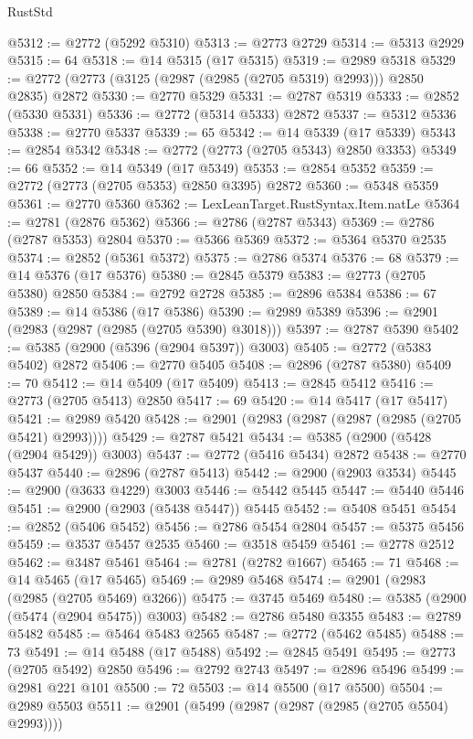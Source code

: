 \begin{lexlean}{RustStd}
\begin{coremodule}
@5312 := @2772 (@5292 @5310)
@5313 := @2773 @2729
@5314 := @5313 @2929
@5315 := 64
@5318 := @14 @5315 (@17 @5315)
@5319 := @2989 @5318
@5329 := @2772 (@2773 (@3125 (@2987 (@2985 (@2705 @5319) @2993))) @2850 @2835) @2872
@5330 := @2770 @5329
@5331 := @2787 @5319
@5333 := @2852 (@5330 @5331)
@5336 := @2772 (@5314 @5333) @2872
@5337 := @5312 @5336
@5338 := @2770 @5337
@5339 := 65
@5342 := @14 @5339 (@17 @5339)
@5343 := @2854 @5342
@5348 := @2772 (@2773 (@2705 @5343) @2850 @3353)
@5349 := 66
@5352 := @14 @5349 (@17 @5349)
@5353 := @2854 @5352
@5359 := @2772 (@2773 (@2705 @5353) @2850 @3395) @2872
@5360 := @5348 @5359
@5361 := @2770 @5360
@5362 := LexLeanTarget.RustSyntax.Item.natLe
@5364 := @2781 (@2876 @5362)
@5366 := @2786 (@2787 @5343)
@5369 := @2786 (@2787 @5353) @2804
@5370 := @5366 @5369
@5372 := @5364 @5370 @2535
@5374 := @2852 (@5361 @5372)
@5375 := @2786 @5374
@5376 := 68
@5379 := @14 @5376 (@17 @5376)
@5380 := @2845 @5379
@5383 := @2773 (@2705 @5380) @2850
@5384 := @2792 @2728
@5385 := @2896 @5384
@5386 := 67
@5389 := @14 @5386 (@17 @5386)
@5390 := @2989 @5389
@5396 := @2901 (@2983 (@2987 (@2985 (@2705 @5390) @3018)))
@5397 := @2787 @5390
@5402 := @5385 (@2900 (@5396 (@2904 @5397)) @3003)
@5405 := @2772 (@5383 @5402) @2872
@5406 := @2770 @5405
@5408 := @2896 (@2787 @5380)
@5409 := 70
@5412 := @14 @5409 (@17 @5409)
@5413 := @2845 @5412
@5416 := @2773 (@2705 @5413) @2850
@5417 := 69
@5420 := @14 @5417 (@17 @5417)
@5421 := @2989 @5420
@5428 := @2901 (@2983 (@2987 (@2987 (@2985 (@2705 @5421) @2993))))
@5429 := @2787 @5421
@5434 := @5385 (@2900 (@5428 (@2904 @5429)) @3003)
@5437 := @2772 (@5416 @5434) @2872
@5438 := @2770 @5437
@5440 := @2896 (@2787 @5413)
@5442 := @2900 (@2903 @3534)
@5445 := @2900 (@3633 @4229) @3003
@5446 := @5442 @5445
@5447 := @5440 @5446
@5451 := @2900 (@2903 (@5438 @5447)) @5445
@5452 := @5408 @5451
@5454 := @2852 (@5406 @5452)
@5456 := @2786 @5454 @2804
@5457 := @5375 @5456
@5459 := @3537 @5457 @2535
@5460 := @3518 @5459
@5461 := @2778 @2512
@5462 := @3487 @5461
@5464 := @2781 (@2782 @1667)
@5465 := 71
@5468 := @14 @5465 (@17 @5465)
@5469 := @2989 @5468
@5474 := @2901 (@2983 (@2985 (@2705 @5469) @3266))
@5475 := @3745 @5469
@5480 := @5385 (@2900 (@5474 (@2904 @5475)) @3003)
@5482 := @2786 @5480 @3355
@5483 := @2789 @5482
@5485 := @5464 @5483 @2565
@5487 := @2772 (@5462 @5485)
@5488 := 73
@5491 := @14 @5488 (@17 @5488)
@5492 := @2845 @5491
@5495 := @2773 (@2705 @5492) @2850
@5496 := @2792 @2743
@5497 := @2896 @5496
@5499 := @2981 @221 @101
@5500 := 72
@5503 := @14 @5500 (@17 @5500)
@5504 := @2989 @5503
@5511 := @2901 (@5499 (@2987 (@2987 (@2985 (@2705 @5504) @2993))))

\end{coremodule}
\end{lexlean}
